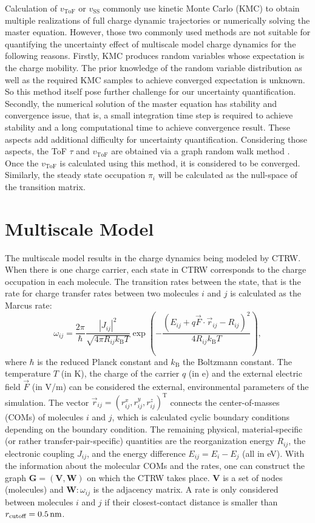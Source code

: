 \documentclass[letterpaper,12pt]{article}
\begin{document}
Calculation of $v_\text{ToF}$ or $v_\text{SS}$ commonly use kinetic Monte Carlo (KMC) to obtain multiple realizations of full charge dynamic trajectories 
or numerically solving the master equation. 
However, those two commonly used methods are not suitable for quantifying the uncertainty effect of multiscale model charge dynamics for the following reasons. 
Firstly, KMC produces random variables whose expectation is the charge mobility. The prior knowledge of the random variable distribution as well as the required KMC samples to achieve converged expectation is unknown. So this method itself pose further challenge for our uncertainty quantification. 
Secondly, the numerical solution of the master equation has stability and convergence issue, that is, a small integration time step is required to achieve stability and a long computational time to achieve convergence result. These aspects add additional difficulty for uncertainty quantification. 
Considering those aspects, the ToF $\tau$ and $v_\text{ToF}$ are obtained via a graph random walk method
\cite{chen_graph_2024}. Once the $v_\text{ToF}$ is calculated using this method, it is considered to be converged. 
Similarly, the steady state occupation $\pi_i$ will be calculated as the null-space of the transition matrix. 

\section{Multiscale Model}
The multiscale model results in the charge dynamics being modeled by CTRW. When there is one charge carrier, each state in CTRW corresponds to the charge occupation in each molecule. The transition rates between the state, that is the rate for charge transfer rates between two molecules $i$ and $j$ is calculated as the Marcus rate:
%
\begin{equation}
    \omega_{ij} = \frac{2\pi}{\hbar} \frac{|J_{ij}|^2}{\sqrt{4\pi R_{ij} k_\text{B}T}} \exp\left(-\frac{(E_{ij} + q \vec{F} \cdot \vec{r}_{ij} - R_{ij})^2}{4R_{ij} k_\text{B}T}\right) ,
    \label{equ:Marcus}
\end{equation}
%
where $\hbar$ is the reduced Planck constant and $k_\text{B}$ the Boltzmann constant. The temperature $T$ (in \unit[]{K}), the charge of the carrier $q$ (in \unit[]{e}) and the external electric field $\vec{F}$ (in V/m) can be considered the external, environmental parameters of the simulation. The vector $\vec{r}_{ij} = (r^x_{ij},r^y_{ij},r^z_{ij})^\text{T}$ connects the center-of-masses (COMs) of molecules $i$ and $j$, which is calculated cyclic boundary conditions depending on the boundary condition. The remaining physical, material-specific (or rather transfer-pair-specific) quantities are the reorganization energy $R_{ij}$, the electronic coupling $J_{ij}$, and the energy difference $E_{ij} = E_i - E_j$ (all in \unit[]{eV}). With the information about the molecular COMs and the rates, one can construct the graph $\mathbf{G}=(\mathbf{V}, \mathbf{W})$ on which the CTRW takes place. $\mathbf{V}$ is a set of nodes (molecules) and $\mathbf{W}: \omega_{ij}$ is the adjacency matrix. A rate is only considered between molecules $i$ and $j$ if their closest-contact distance is smaller than $r_\text{cutoff}=\unit[0.5]{nm}$.
\end{document}
